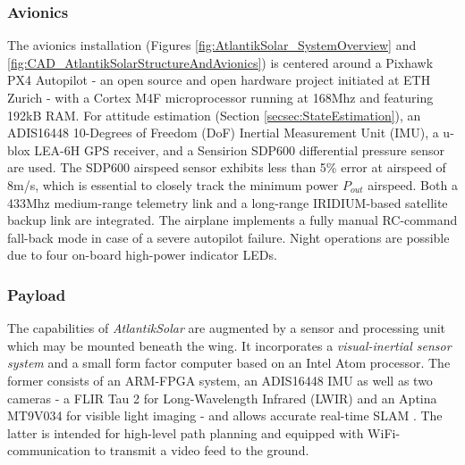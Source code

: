 \subsubsection{Avionics} \label{secsec:Avionics}
The avionics installation (Figures \ref{fig:AtlantikSolar_SystemOverview} and \ref{fig:CAD_AtlantikSolarStructureAndAvionics}) is centered around a Pixhawk PX4 Autopilot - an open source and open hardware project initiated at ETH Zurich - with a Cortex M4F microprocessor running at 168Mhz and featuring 192kB RAM. For attitude estimation (Section \ref{secsec:StateEstimation}), an ADIS16448 10-Degrees of Freedom (DoF) Inertial Measurement Unit (IMU), a u-blox LEA-6H GPS receiver, and a Sensirion SDP600 differential pressure sensor are used. The SDP600 airspeed sensor exhibits less than 5\% error at airspeed of 8m/s, which is essential to closely track the minimum power $P_{out}$ airspeed. Both a 433Mhz medium-range telemetry link and a long-range IRIDIUM-based satellite backup link are integrated. The airplane implements a fully manual RC-command fall-back mode in case of a severe autopilot failure. Night operations are possible due to four on-board high-power indicator LEDs.

\subsubsection{Payload}
The capabilities of \textit{AtlantikSolar} are augmented by a sensor and processing unit which may be mounted beneath the wing. It incorporates a \emph{visual-inertial sensor system} \cite{nikolic2014synchronized} and a small form factor computer based on an Intel Atom processor. The former consists of an ARM-FPGA system, an ADIS16448 IMU as well as two cameras - a FLIR Tau 2 for Long-Wavelength Infrared (LWIR) and an Aptina MT9V034 for visible light imaging - and allows accurate real-time SLAM \cite{Leutenegger_PhD}. The latter is intended for high-level path planning and equipped with WiFi-communication to transmit a video feed to the ground.

